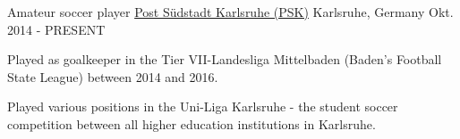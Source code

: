 

\begin{cventries}

  \cventry
    {Amateur soccer player} %
    {\href{https://www.fupa.net/player/martin-loeper-702462}{Post Südstadt Karlsruhe (PSK)}} %
    {Karlsruhe, Germany} %
    {Okt. 2014 - PRESENT} %
    {
      \begin{cvitems} %
        \item {Played as goalkeeper in the Tier VII-Landesliga Mittelbaden (Baden's Football State League) between 2014 and 2016.}
        \item {Played various positions in the Uni-Liga Karlsruhe - the student soccer competition between all higher education institutions in Karlsruhe.}
      \end{cvitems}
    }

\end{cventries}
